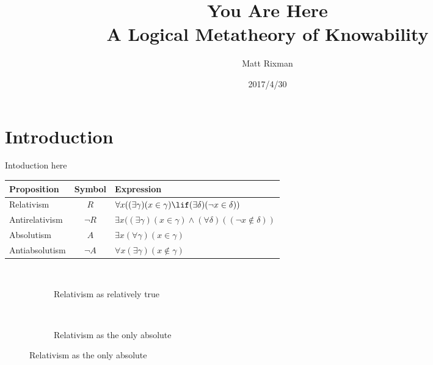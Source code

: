 \documentclass{article}
\title{You Are Here \\
\large A Logical Metatheory of Knowability}
\author{Matt Rixman}
\date{2017/4/30}
\begin{document}
\maketitle

\section{Introduction}
Intoduction here\\

\begin{table}
    \begin{tabular}{l|c|l}
        \hline
        Proposition & Symbol & Expression \\ \hline
        Relativism  & $R$ & $\forall{x}((\exists{\gamma})(x \in \gamma) \lif (\exists{\delta})({\lnot}x \in \delta))$ \\
        Antirelativism & $\neg R$ & $\exists{x}((\exists{\gamma})(x \in \gamma) \land (\forall{\delta})(({\neg}x \notin \delta))$ \\
        Absolutism & $A$ & $\exists{x}(\forall{\gamma})(x \in \gamma)$ \\
        Antiabsolutism & $\neg A$ & $\forall{x}(\exists{\gamma})(x \notin \gamma)$ \\
    \end{tabular}
\end{table}



\begin{figure}
\begin{subfigure}{.5\textwidth}
    \fitchctx
    {
        \pline{\bigstar}\\
        \subproof
        {
        }
        {
            \subproof
            {
            }
            {
                \pline{}
            }
            \subproof
            {
            }
            {
                \pline{}
            }
        }
        \subproof
        {
        }
        {
            \subproof
            {
            }
            {
                \pline{}
            }
        }
    }
    \caption{Relativism as relatively true}
\end{subfigure}%
\begin{subfigure}{.5\textwidth}
    \fitchprf
    {
    }
    {
        \pline{\bigstar}\\
        \subproof
        {
        }
        {
            \subproof
            {
            }
            {
                \pline{\lfalse}
            }
        }
    }
    \caption{Relativism as the only absolute}
\end{subfigure}
\end{figure}
\end{document}

